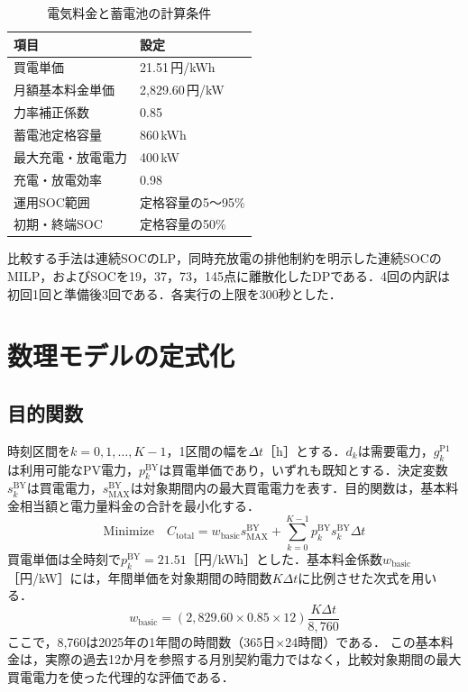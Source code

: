 \documentclass[a4paper,11pt,xelatex,ja=standard]{bxjsarticle}
\begin{document}
\begin{table}[htbp]
    \centering
    \caption{電気料金と蓄電池の計算条件}
    \label{tab:system-conditions}
    \begin{tabular}{p{50mm}p{103mm}}
        \toprule
        項目        & 設定             \\
        \midrule
        買電単価      & 21.51\,円/kWh   \\
        月額基本料金単価  & 2,829.60\,円/kW \\
        力率補正係数    & 0.85           \\
        蓄電池定格容量   & 860\,kWh       \\
        最大充電・放電電力 & 400\,kW        \\
        充電・放電効率   & 0.98           \\
        運用SOC範囲   & 定格容量の5～95\%    \\
        初期・終端SOC  & 定格容量の50\%      \\
        \bottomrule
    \end{tabular}
\end{table}

比較する手法は連続SOCのLP，同時充放電の排他制約を明示した連続SOCのMILP，およびSOCを19，37，73，145点に離散化したDPである．4回の内訳は初回1回と準備後3回である．各実行の上限を300秒とした．

\section{数理モデルの定式化}
\subsection{目的関数}
時刻区間を$k=0,1,\ldots,K-1$，1区間の幅を$\Delta t$［h］とする．$d_k$は需要電力，$g^{\mathrm{P1}}_k$は利用可能なPV電力，$p^{\mathrm{BY}}_k$は買電単価であり，いずれも既知とする．決定変数$s^{\mathrm{BY}}_k$は買電電力，$s^{\mathrm{BY}}_{\mathrm{MAX}}$は対象期間内の最大買電電力を表す．目的関数は，基本料金相当額と電力量料金の合計を最小化する．
\begin{equation}
    \text{Minimize}\quad C_{\mathrm{total}}
    = w_{\mathrm{basic}}s^{\mathrm{BY}}_{\mathrm{MAX}}
    + \sum_{k=0}^{K-1}p^{\mathrm{BY}}_k s^{\mathrm{BY}}_k\Delta t
    \label{eq:objective}
\end{equation}
買電単価は全時刻で$p^{\mathrm{BY}}_k=21.51$［円/kWh］とした．基本料金係数$w_{\mathrm{basic}}$［円/kW］には，年間単価を対象期間の時間数$K\Delta t$に比例させた次式を用いる．
\begin{equation}
    w_{\mathrm{basic}}
    = (2{,}829.60\times0.85\times12)
    \frac{K\Delta t}{8{,}760}
    \label{eq:basic-weight}
\end{equation}
ここで，8,760は2025年の1年間の時間数（365日$\times$24時間）である．
この基本料金は，実際の過去12か月を参照する月別契約電力ではなく，比較対象期間の最大買電電力を使った代理的な評価である．
\end{document}
